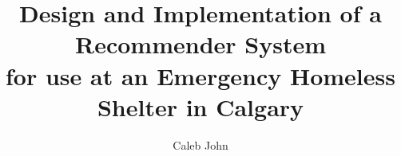 \documentclass{ucalgarythesis}
\theoremstyle{plain}
\theoremstyle{definition}
\newcommand{\Abb}[0]{RuGRATS }
\begin{document}


  \title{
  Design and Implementation of a Recommender System \\for use at an Emergency Homeless Shelter in Calgary
   }
   
  \author{Caleb John}
  

  \frontmatter           %
  \makethesistitle       %


\end{document}
